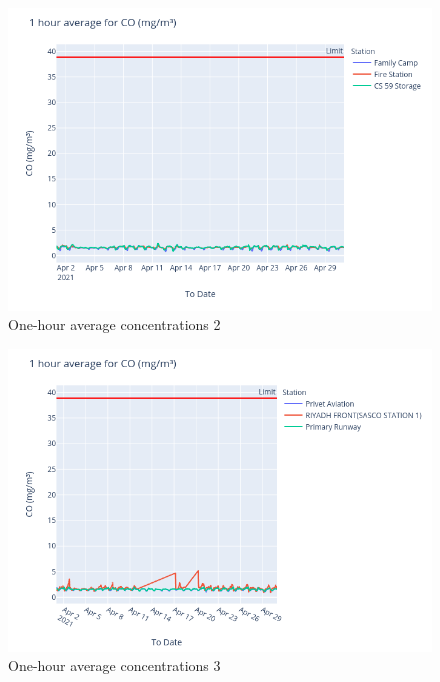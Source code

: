 \documentclass[12pt, oneside]{book}
\begin{document}
{
{\begin{figure}[H]
\centering
\includegraphics[width=\textwidth]{image194}
\caption{One-hour average  concentrations 2}\label{image194}
\end{figure}}{}


{\begin{figure}[H]
\centering
\includegraphics[width=\textwidth]{image206}
\caption{One-hour average  concentrations 3}\label{image206}
\end{figure}}{}

}
\end{document}
